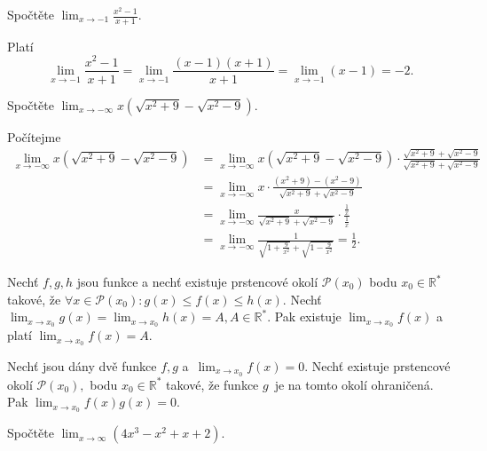 \begin{priklad}
Spočtěte $\lim_{x\to -1}\frac{x^2-1}{x+1}$.
\end{priklad}

\begin{reseni}
 Platí
 $$\lim_{x\to -1}\frac{x^2-1}{x+1}=\lim_{x\to -1}\frac{(x-1)(x+1)}{x+1}=\lim_{x\to -1}(x-1)=-2.$$
\end{reseni}

\begin{priklad}
Spočtěte $\lim_{x\to-\infty}x(\sqrt{x^2+9}-\sqrt{x^2-9})$.
\end{priklad}

\begin{reseni}
Počítejme
\begin{align*}
	\lim_{x\to-\infty}x(\sqrt{x^2+9}-\sqrt{x^2-9}) &= \lim_{x \to -\infty} x(\sqrt{x^2+9}-\sqrt{x^2-9}) \cdot \frac{\sqrt{x^2+9}+\sqrt{x^2-9}}{\sqrt{x^2+9}+\sqrt{x^2-9}}\\
	&= \lim_{x \to -\infty} x \cdot \frac{(x^2 + 9) - (x^2 - 9)}{\sqrt{x^2+9}+\sqrt{x^2-9}} \\
	&= \lim_{x \to -\infty} \frac{x}{\sqrt{x^2+9}+\sqrt{x^2-9}} \cdot \frac{\frac{1}{x}}{\frac{1}{x}} \\
	&= \lim_{x \to -\infty} \frac{1}{\sqrt{1+\frac{9}{x^2}}+\sqrt{1-\frac{9}{x^2}}} = \frac{1}{2}.
\end{align*}
\end{reseni}

\begin{veta}
Nechť $f,g,h$ jsou funkce a nechť existuje prstencové okolí $\mathscr P(x_0)$
bodu $x_0\in \mathbb R^*$ takové, že $\forall x \in \mathscr P(x_0)\colon g(x)\leq f(x)\leq h(x).$
Nechť $\lim_{x\to x_0}g(x)=\lim_{x\to x_0}h(x)=A, A \in \mathbb R^*.$ Pak existuje
$\lim_{x\to x_0}f(x)$ a  platí $ \lim_{x\to x_0}f(x) = A.$
\end{veta}

\begin{veta}
Nechť jsou dány dvě funkce $f,g$ a~$\lim_{x\to x_0}f(x)=0.$ Nechť existuje prstencové
okolí $\mathscr P(x_0),$ bodu $x_0\in \mathbb R^*$ takové, že
funkce $g$~je na tomto okolí ohraničená. Pak $\lim_{x\to x_0}f(x)g(x)=0.$
\end{veta}

\begin{priklad}
Spočtěte $\lim_{x\to \infty}\left ( 4x^3-x^2+x+2 \right ) .$
\end{priklad}

